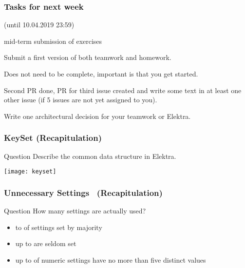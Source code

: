 \begin{assignment}
	\frametitle{Tasks for next week}
	(until 10.04.2019 23:59)

	mid-term submission of exercises
	
	\begin{task}
	Submit a first version of both teamwork and homework.
	\end{task}

	Does not need to be complete, important is that you get started.
	\pause

	\begin{task}
	Second PR done, PR for third issue created and write some text in at least one other issue (if 5 issues are not yet assigned to you).
	\end{task}
	\pause

	\begin{task}
	Write one architectural decision for your teamwork or Elektra.
	\end{task}
\end{assignment}




\begin{frame}
	\frametitle{KeySet (Recapitulation)}

	\begin{alertblock}{Question}
	Describe the common data structure in Elektra.
	\end{alertblock}

	\vspace{1cm}
	\pause

	\texttt{[image: keyset]}
\end{frame}

\begin{frame}
	\frametitle{Unnecessary Settings~\cite{xu2015hey} (Recapitulation)}

	\begin{alertblock}{Question}
	How many settings are actually used?
	\end{alertblock}

	\pause

	\begin{itemize}
	\item {} to  of settings set by majority
	\item up to  are seldom set
	\item up to  of numeric settings have no more than five distinct values
	\end{itemize}
\end{frame}


